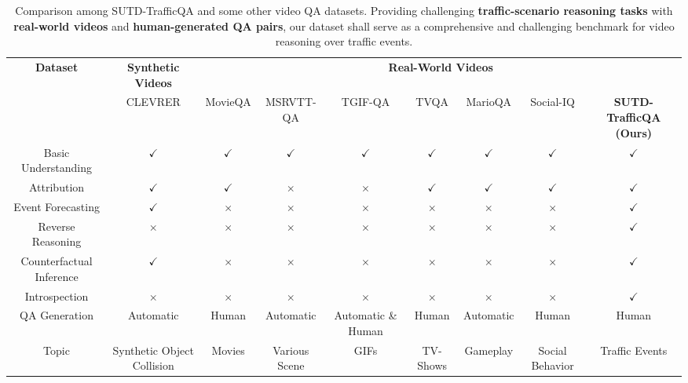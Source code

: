 \documentclass[final]{cvpr}
\begin{document}
\begin{table*}[t]
\caption{Comparison among SUTD-TrafficQA and some other video QA datasets. Providing challenging \textbf{traffic-scenario reasoning tasks} with \textbf{real-world videos} and \textbf{human-generated QA pairs}, our dataset shall serve as a comprehensive and challenging benchmark for video reasoning over traffic events.}
\vspace{-0.2cm}
\begin{center}
\scriptsize
\setlength\tabcolsep{0.5pt}
\begin{tabular}{c|c|ccccccc} \hline
\multirow{2}{*}{\textbf{Dataset}} & \textbf{Synthetic Videos} & \multicolumn{7}{c}{\textbf{Real-World Videos}} \\
\cline{2-9}
& CLEVRER \cite{yi2019clevrer} 
        & MovieQA \cite{tapaswi2016movieqa} & MSRVTT-QA \cite{xu2017video} & TGIF-QA \cite{jang2017tgif} & TVQA \cite{lei2018tvqa} &  MarioQA \cite{mun2017marioQA} & Social-IQ \cite{zadeh2019social} &  \textbf{SUTD-TrafficQA (Ours)} \\ \hline
Basic Understanding  & $\checkmark$ & $\checkmark$ & $\checkmark$ & $\checkmark$ & $\checkmark$ & $\checkmark$ & $\checkmark$ & \textbf{$\checkmark$} \\ 
Attribution  & $\checkmark$ & $\checkmark$ & $\times$ & $\times$ & $\checkmark$ & $\checkmark$ & $\checkmark$ & \textbf{$\checkmark$} \\
Event Forecasting & $\checkmark$ & $\times$    & $\times$ & $\times$     & $\times$     & $\times$     & $\times$     & \textbf{$\checkmark$}  \\ 
Reverse Reasoning  & $\times$     & $\times$     & $\times$ & $\times$     & $\times$     & $\times$     & $\times$     & \textbf{$\checkmark$} \\ 
Counterfactual Inference & $\checkmark$ & $\times$    & $\times$ & $\times$     & $\times$     & $\times$     & $\times$     & \textbf{$\checkmark$} \\ 
Introspection   & $\times$     &$\times$     & $\times$&  $\times$     & $\times$     & $\times$     & $\times$     & \textbf{$\checkmark$} \\
\hline
QA Generation & Automatic & Human & Automatic & Automatic \& Human & Human & Automatic & Human & Human \\ \hline
Topic & Synthetic Object Collision & Movies & Various Scene & GIFs & TV-Shows & Gameplay & Social Behavior & Traffic Events\\ \hline
\end{tabular}
\end{center}
\label{table:dataset_comparison}
\vspace{-0.5cm}
\end{table*}
\end{document}
